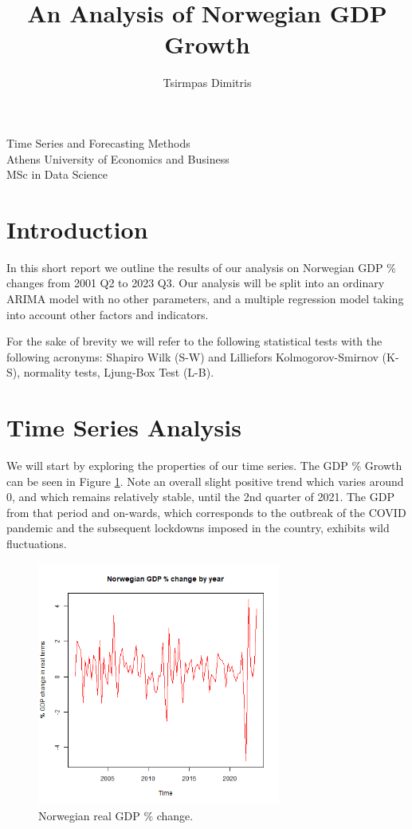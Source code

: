 \documentclass[11pt, a4paper]{article}
\title{\Huge An Analysis of Norwegian GDP Growth }
\author{\LARGE Tsirmpas Dimitris }
\begin{document}
	\maketitle
	\begin{center}
		\LARGE Time Series and Forecasting Methods \\
		\large Athens University of Economics and Business \\
		\large MSc in Data Science
		
	\end{center}
		

	\section{Introduction}
	In this short report we outline the results of our analysis on Norwegian GDP \% changes from 2001 Q2 to 2023 Q3. Our analysis will be split into an ordinary ARIMA model with no other parameters, and a multiple regression model taking into account other factors and indicators. 
	
	For the sake of brevity we will refer to the following statistical tests with the following acronyms: Shapiro Wilk (S-W) and Lilliefors Kolmogorov-Smirnov (K-S), normality tests, Ljung-Box Test (L-B).
	
	
	\section{Time Series Analysis}
	We will start by exploring the properties of our time series. The GDP  \% Growth can be seen in Figure \ref{fig::gdp}. Note an overall slight positive trend which varies around $0$, and which remains relatively stable, until the 2nd quarter of 2021. The GDP from that period and on-wards, which corresponds to the outbreak of the COVID pandemic and the subsequent lockdowns imposed in the country,  exhibits wild fluctuations.
	
	\begin{figure}
		\includegraphics[width=8cm]{gdp.png}
		\centering
		\caption{Norwegian real GDP \% change.}
		\label{fig::gdp}
	\end{figure}
	
\end{document}
